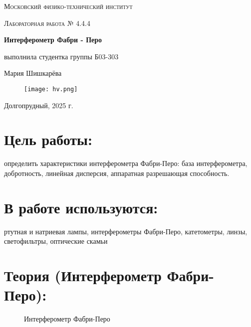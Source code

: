 \documentclass[a4paper, 12pt]{article}
\begin{document}
\begin{titlepage}
\centering
{\scshape\LARGE Московский физико-технический институт \par}
\vspace{3cm}
{\scshape\Large Лабораторная работа № 4.4.4 \par}
\vspace{1cm}
{\huge\bfseries Интерферометр Фабри - Перо \par}
\vspace{3cm}

\vfill
\begin{flushright}
{\large выполнила студентка группы Б03-303}\par
\vspace{0.3cm}
{\LARGE Мария Шишкарёва}
\end{flushright}
\vfill

\begin{figure}[h]
 \centering
\texttt{[image: hv.png]}
\end{figure}
Долгопрудный, 2025 г.
\end{titlepage}

\large\section{Цель работы:}
определить характеристики интерферометра Фабри-Перо: база интерферометра, добротность, линейная дисперсия, аппаратная разрешающая способность.

\large\section{В работе используются:}
ртутная и натриевая лампы, интерферометры Фабри-Перо, катетометры, линзы, светофильтры, оптические скамьи

\large\section{Теория (Интерферометр Фабри-Перо):}

\begin{figure}[h]
	\begin{minipage}[h]{0.55\linewidth}
	\end{minipage}
	\begin{minipage}[h]{0.5\linewidth}
	\end{minipage}
  \caption[]{\label{fig:ifp} Интерферометр Фабри-Перо}
\end{figure}
\end{document}
